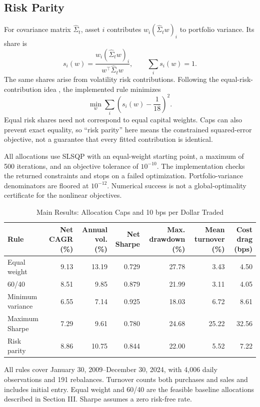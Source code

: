 \documentclass[conference]{IEEEtran}
\begin{document}
\subsection{Risk Parity}
For covariance matrix $\widehat\Sigma_t$, asset $i$ contributes $w_i(\widehat\Sigma_t w)_i$ to portfolio variance. Its share is
\begin{equation}
 s_i(w)=\frac{w_i(\widehat\Sigma_t w)_i}
 {w^\top\widehat\Sigma_t w},\qquad \sum_i s_i(w)=1.
\end{equation}
The same shares arise from volatility risk contributions. Following the equal-risk-contribution idea \cite{maillard}, the implemented rule minimizes
\begin{equation}
 \min_w\sum_i\left(s_i(w)-\frac{1}{18}\right)^2.
\end{equation}
Equal risk shares need not correspond to equal capital weights. Caps can also prevent exact equality, so ``risk parity'' here means the constrained squared-error objective, not a guarantee that every fitted contribution is identical.

All allocations use SLSQP with an equal-weight starting point, a maximum of 500 iterations, and an objective tolerance of $10^{-10}$. The implementation checks the returned constraints and stops on a failed optimization. Portfolio-variance denominators are floored at $10^{-12}$. Numerical success is not a global-optimality certificate for the nonlinear objectives.

\begin{table}[t]
\caption{Main Results: Allocation Caps and 10 bps per Dollar Traded}
\label{tab:main}
\centering
\small
\begin{tabular}{@{}lrrrrrr@{}}
\toprule
Rule & Net CAGR (\%) & Annual vol. (\%) & Net Sharpe & Max. drawdown (\%) & Mean turnover (\%) & Cost drag (bps) \\
\midrule
Equal weight & 9.13 & 13.19 & 0.729 & 27.78 & 3.43 & 4.50 \\
60/40 & 8.51 & 9.85 & 0.879 & 21.99 & 3.11 & 4.05 \\
Minimum variance & 6.55 & 7.14 & 0.925 & 18.03 & 6.72 & 8.61 \\
Maximum Sharpe & 7.29 & 9.61 & 0.780 & 24.68 & 25.22 & 32.56 \\
Risk parity & 8.86 & 10.75 & 0.844 & 22.00 & 5.52 & 7.22 \\
\bottomrule
\end{tabular}
\par\smallskip
\begin{minipage}{0.96\textwidth}
\footnotesize All rules cover January 30, 2009--December 30, 2024, with 4,006 daily observations and 191 rebalances. Turnover counts both purchases and sales and includes initial entry. Equal weight and 60/40 are the feasible baseline allocations described in Section III. Sharpe assumes a zero risk-free rate.
\end{minipage}
\end{table}
\end{document}
